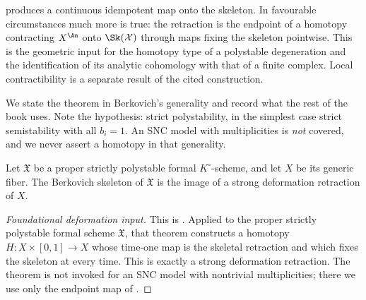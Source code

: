  produces a continuous idempotent map onto
the skeleton. In favourable circumstances much more is true: the retraction
is the endpoint of a homotopy contracting $X^{\An}$ onto
$\Sk(\mathcal X)$ through maps fixing the skeleton pointwise. This is the
geometric input for the homotopy type of a polystable degeneration and the
identification of its analytic cohomology with that of a finite complex.
Local contractibility is a separate result of the cited construction.

We state the theorem in Berkovich's generality and record what the rest of
the book uses. Note the hypothesis: strict polystability, in the simplest
case strict semistability with all $b_i=1$. An SNC model with
multiplicities is \emph{not} covered, and we never assert a homotopy in that
generality.

\begin{theorem}\label{thm:skeleton-deformation}
Let $\mathfrak X$ be a proper strictly polystable formal
$K^\circ$-scheme, and let $X$ be its generic fiber. The Berkovich
skeleton of $\mathfrak X$ is the image of a strong deformation retraction
of $X$.
\end{theorem}
\begin{proof}[Foundational deformation input]
This is \cite[Theorem~8.1]{Berkovich1999LocalContractibility}.  Applied to
the proper strictly polystable formal scheme $\mathfrak X$, that theorem
constructs a homotopy $H:X\times[0,1]\to X$ whose time-one map is the
skeletal retraction and which fixes the skeleton at every time.  This is
exactly a strong deformation retraction.  The theorem is not invoked for an
SNC model with nontrivial multiplicities; there we use only the endpoint map
of .
\end{proof}

